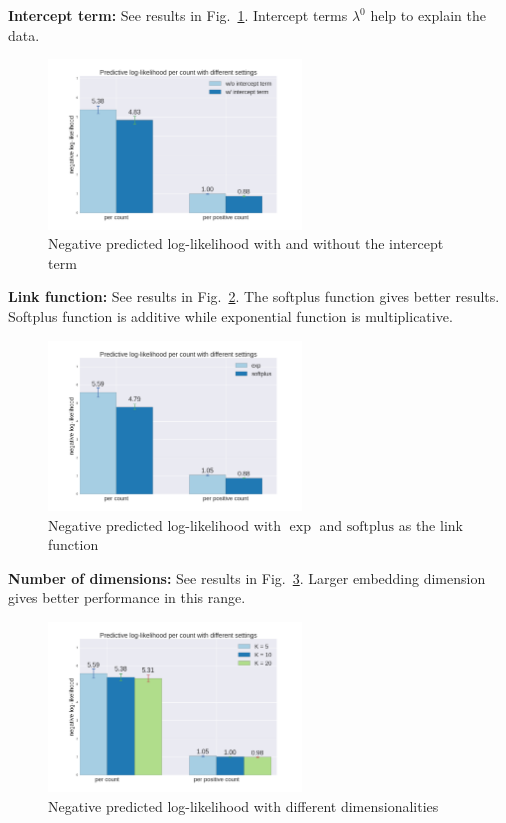 \documentclass{article}
\begin{document}
{\bf Intercept term: } See results in Fig.~\ref{fig_intercept_term}. Intercept terms $\lambda^0$ help to explain the data. 
\begin{figure}[t]
    \centering
    \includegraphics[width=0.6\textwidth]{figures/intercept_term.png}
    \caption{Negative predicted log-likelihood with and without the intercept term}
    \label{fig_intercept_term}
\end{figure}


{\bf Link function:} See results in Fig.~\ref{fig_link_func}. The softplus function gives better results. 
Softplus function is additive while exponential function is multiplicative. 
\begin{figure}[t]
    \centering
    \includegraphics[width=0.6\textwidth]{figures/link_func.png}
    \caption{Negative predicted log-likelihood with $\exp$ and $\mathrm{softplus}$ as the link function}
    \label{fig_link_func}
\end{figure}

{\bf Number of dimensions:} See results in Fig.~\ref{fig_dimensionality}. Larger embedding dimension gives better performance in this range.  
\begin{figure}[t]
    \centering
    \includegraphics[width=0.6\textwidth]{figures/variate_K.png}
    \caption{Negative predicted log-likelihood with different dimensionalities}
    \label{fig_dimensionality}
\end{figure}
\end{document}
